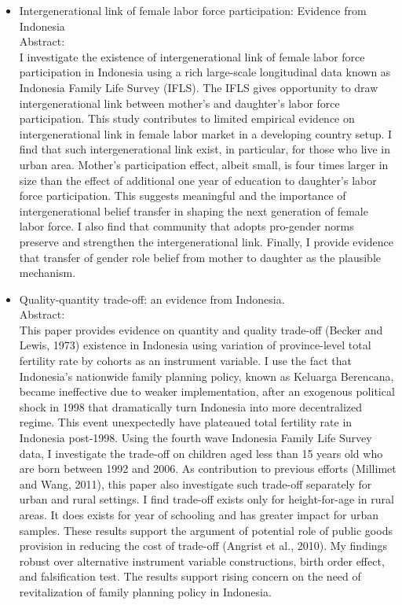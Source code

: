 \begin{itemize}
\item 
Intergenerational link of female labor force participation: Evidence from Indonesia \\

Abstract: \\
I investigate the existence of intergenerational link of female labor force participation in Indonesia using a rich large-scale longitudinal data known as Indonesia Family Life Survey (IFLS). The IFLS gives opportunity to draw intergenerational link between mother's and daughter's labor force participation. This study contributes to limited empirical evidence on intergenerational link in female labor market in a developing country setup. I find that such intergenerational link exist, in particular, for those who live in urban area. Mother's participation effect, albeit small, is four times larger in size than the effect of additional one year of education to daughter's labor force participation. This suggests meaningful and the importance of intergenerational belief transfer in shaping the next generation of female labor force. I also find that community that adopts pro-gender norms preserve and strengthen the intergenerational link. Finally, I provide evidence that transfer of gender role belief from mother to daughter as the plausible mechanism.

 

\item 
Quality-quantity trade-off: an evidence from Indonesia. \\

Abstract: \\
This paper provides evidence on quantity and quality trade-off (Becker and Lewis, 1973) existence in Indonesia using variation of province-level total fertility rate by cohorts as an instrument variable. I use the fact that Indonesia's nationwide family planning policy, known as Keluarga Berencana, became ineffective
due to weaker implementation, after an exogenous political shock in 1998 that dramatically turn Indonesia into more decentralized regime. This event unexpectedly have plateaued total fertility rate in Indonesia post-1998. Using the fourth wave Indonesia Family Life Survey data, I investigate the trade-off on
children aged less than 15 years old who are born between 1992 and 2006. As contribution to previous efforts (Millimet and Wang, 2011), this paper also investigate such trade-off separately for urban and rural settings. I find trade-off exists only for height-for-age in rural areas. It does exists for year of schooling and has greater impact for urban samples. These results support the argument of potential role of public goods provision in reducing the cost of trade-off (Angrist et al., 2010). My findings robust over alternative instrument variable constructions, birth order effect, and falsification test. The results support rising concern on the need of revitalization of family planning policy in Indonesia.
\end{itemize}


